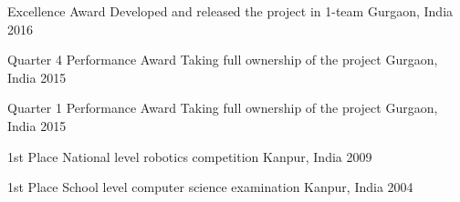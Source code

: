 



\begin{cvhonors}

  \cvhonor
    {Excellence Award} %
    {Developed and released the project in 1-team} %
    {Gurgaon, India} %
    {2016} %

  \cvhonor
    {Quarter 4 Performance Award} %
    {Taking full ownership of the project} %
    {Gurgaon, India} %
    {2015} %

  \cvhonor
    {Quarter 1 Performance Award} %
    {Taking full ownership of the project} %
    {Gurgaon, India} %
    {2015} %

\end{cvhonors}




\begin{cvhonors}

  \cvhonor
    {1st Place} %
    {National level robotics competition} %
    {Kanpur, India} %
    {2009} %

  \cvhonor
    {1st Place} %
    {School level computer science examination} %
    {Kanpur, India} %
    {2004} %

\end{cvhonors}

